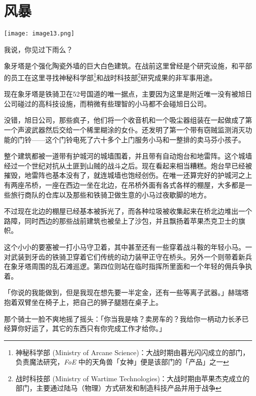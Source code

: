 \chapter{风暴}

\texttt{[image: image13.png]}

\begin{intro}
我说，你见过下雨么？
\end{intro}


象牙塔是个强化陶瓷外墙的巨大白色建筑。在战前这里曾经是个研究设施，和平部的员工在这里寻找神秘科学部\footnote{神秘科学部 (Ministry of Arcane Science)：大战时期由暮光闪闪成立的部门，负责魔法研究，\emph{FoE} 中的天角兽「女神」便是该部门的「产品」之一}和战时科技部\footnote{战时科技部 (Ministry of Wartime Technologies)：大战时期由苹果杰克成立的部门，主要通过陆马（物理）方式研发和制造科技产品并用于战争}研究成果的非军事用途。

现在象牙塔是铁骑卫在52号国道的唯一据点，主要因为这里是附近唯一没有被旭日公司碰过的高科技设施，而稍微有些理智的小马都不会碰旭日公司。

没错，旭日公司，那些疯子，他们将一个收音机和一个吸尘器组装在一起做成了第一个声波武器然后交给一个稀里糊涂的女仆。还发明了第一个带有窃贼监测消灭功能的门铃——这个门铃电死了六十多个上门服务小马和一整排的卖马芬小孩子。

整个建筑都被一道带有护城河的城墙围着，并且带有自动炮台和地雷阵。这个城墙经过一个世纪对抗从土匪到山贼的战斗之后。现在看起来相当糟糕。炮台早已经被摧毁，地雷阵也基本没有了，就连城墙也饱经创伤。在唯一还算完好的护城河之上有两座吊桥，一座在西边一坐在北边，在吊桥外面有各式各样的棚屋，大多都是一些旅行商队的仓库以及那些和铁骑卫做生意的小马过夜歇脚的地方。

不过现在北边的棚屋已经基本被拆光了，而各种垃圾被收集起来在桥北边堆出一个路障，同时西边的那些战前建筑也被垒上了沙包，并且飘扬着苹果杰克卫士的旗帜。

这个小小的要塞被一打小马守卫着，其中甚至还有一些穿着战斗鞍的年轻小马。一对武装到牙齿的铁骑卫穿着它们传统的动力装甲正守在桥头。另外一个则带着新兵在象牙塔周围的乱石滩巡逻。第四位则站在临时指挥所里面和一个年轻的佣兵争执着。

「你说的我能做到，但是我现在想先要一半定金，还有一些等离子武器。」赫瑞塔抱着双臂坐在椅子上，把自己的狮子腿翘在桌子上。

那个骑士一脸不爽地摇了摇头：「你当我是啥？卖房车的？我给你一柄动力长矛已经算你好运了，其它的东西只有你完成工作才给你。」

